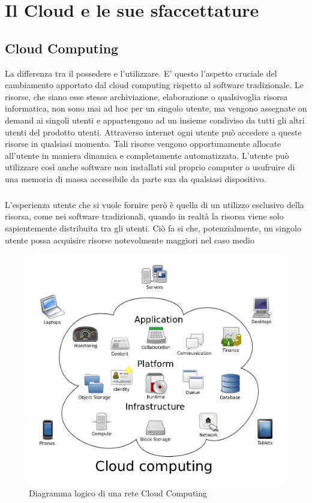 \chapter{Il Cloud e le sue sfaccettature}

\section{Cloud Computing}
La differenza tra il possedere e l'utilizzare. E' questo l'aspetto cruciale del cambiamento apportato dal cloud computing rispetto al software tradizionale. Le risorse, che siano esse stesse archiviazione, elaborazione o qualsivoglia risorsa informatica, non sono mai ad hoc per un singolo utente, ma vengono assegnate on demand ai singoli utenti e appartengono ad un insieme condiviso da tutti gli altri utenti del prodotto utenti. Attraverso internet ogni utente può accedere a queste risorse in qualsiasi momento. Tali risorse vengono opportunamente allocate all'utente in maniera dinamica e completamente automatizzata. L'utente può utilizzare così anche software non installati sul proprio computer o usufruire di una memoria di massa accessibile da parte sua da qualsiasi dispositivo.
\paragraph{}
L'esperienza utente che si vuole fornire però è quella di un utilizzo esclusivo della risorsa, come nei software tradizionali, quando in realtà la risorsa viene solo sapientemente distribuita tra gli utenti. Ciò fa si che, potenzialmente, un singolo utente possa acquisire risorse notevolmente maggiori nel caso medio
\begin{figure}
	\centering
	\includegraphics[width=0.7\linewidth]{capitoli/imgs/CloudComputing}
	\caption{Diagramma logico di una rete Cloud Computing}
	\label{fig:cloudcomputing}
\end{figure}
